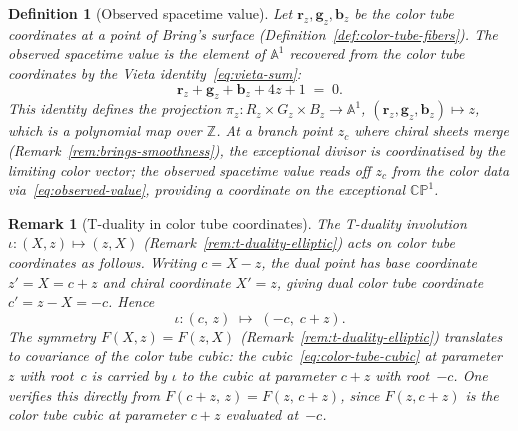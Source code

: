 \documentclass[12pt,a4paper]{report}
\newtheorem{definition}[theorem]{Definition}
\newtheorem{remark}[theorem]{Remark}
\begin{document}
\begin{definition}[Observed spacetime value]
\label{def:observed-value}
  Let $\mathbf{r}_z, \mathbf{g}_z, \mathbf{b}_z$ be the color tube
  coordinates at a point of Bring's surface
  (Definition~\ref{def:color-tube-fibers}).  The
  \emph{observed spacetime value} is the element of $\mathbb{A}^1$
  recovered from the color tube coordinates by the Vieta
  identity~\eqref{eq:vieta-sum}:
  \begin{equation}\label{eq:observed-value}
    \mathbf{r}_z + \mathbf{g}_z + \mathbf{b}_z + 4z + 1 \;=\; 0.
  \end{equation}
  This identity defines the projection
  $\pi_z \colon R_z \times G_z \times B_z \to \mathbb{A}^1$,
  $({\mathbf{r}_z, \mathbf{g}_z, \mathbf{b}_z}) \mapsto z$,
  which is a polynomial map over $\mathbb{Z}$.  At a branch
  point $z_c$ where chiral sheets merge
  (Remark~\ref{rem:brings-smoothness}), the exceptional divisor is
  coordinatised by the limiting color vector; the observed spacetime
  value reads off $z_c$ from the color data via~\eqref{eq:observed-value},
  providing a coordinate on the exceptional $\mathbb{CP}^1$.
\end{definition}

\begin{remark}[T-duality in color tube coordinates]
\label{rem:t-duality-color-tube}
  The T-duality involution $\iota \colon (X, z) \mapsto (z, X)$
  (Remark~\ref{rem:t-duality-elliptic}) acts on color tube
  coordinates as follows.  Writing $c = X - z$, the dual point has
  base coordinate $z' = X = c + z$ and chiral coordinate $X' = z$,
  giving dual color tube coordinate $c' = z - X = -c$.  Hence
  \begin{equation}\label{eq:t-duality-color-tube}
    \iota \colon (c,\, z) \;\longmapsto\; (-c,\; c + z).
  \end{equation}
  The symmetry $F(X,z) = F(z,X)$
  (Remark~\ref{rem:t-duality-elliptic}) translates to covariance of
  the color tube cubic: the cubic~\eqref{eq:color-tube-cubic} at
  parameter~$z$ with root~$c$ is carried by $\iota$ to the cubic at
  parameter $c + z$ with root~$-c$.  One verifies this directly from
  $F(c+z,\, z) = F(z,\, c+z)$, since $F(z, c+z)$ is the color tube
  cubic at parameter $c+z$ evaluated at~$-c$.
\end{remark}
\end{document}
